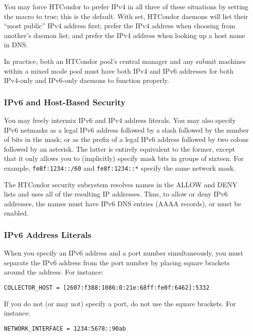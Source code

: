 You may force HTCondor to prefer IPv4 in all three of these situations by
setting the macro  to true; this is the default.
With  set, HTCondor daemons will list their
``most public'' IPv4 address first; prefer the IPv4 address when
choosing from another's daemon list; and prefer the IPv4 address when
looking up a host name in DNS.

In practice, both an HTCondor pool's central manager and any submit
machines within a mixed mode pool must have both IPv4 and IPv6 addresses
for both IPv4-only and IPv6-only  daemons to function
properly.

\subsubsection{IPv6 and Host-Based Security}

You may freely intermix IPv6 and IPv4 address literals.  You may also specify
IPv6 netmasks as a legal IPv6 address followed by a slash followed by the
number of bits in the mask; or as the prefix of a legal IPv6 address followed
by two colons followed by an asterisk.  The latter is entirely equivalent to the
former, except that it only allows you to (implicitly) specify mask bits
in groups of sixteen.  For example, \texttt{fe8f:1234::/60} and
\texttt{fe8f:1234::*} specify the same network mask.

The HTCondor security subsystem resolves names in the ALLOW and DENY
lists and uses all of the resulting IP addresses.  Thus, to allow or deny
IPv6 addresses, the names must have IPv6 DNS entries (AAAA records), or
 must be enabled.

\subsubsection{IPv6 Address Literals}

When you specify an IPv6 address and a port number simultaneously, you
must separate the IPv6 address from the port number by placing square
brackets around the address.  For instance:

\begin{verbatim}
COLLECTOR_HOST = [2607:f388:1086:0:21e:68ff:fe0f:6462]:5332
\end{verbatim}

If you do not (or may not) specify a port, do not use the square brackets.
For instance:

\begin{verbatim}
NETWORK_INTERFACE = 1234:5678::90ab
\end{verbatim}

